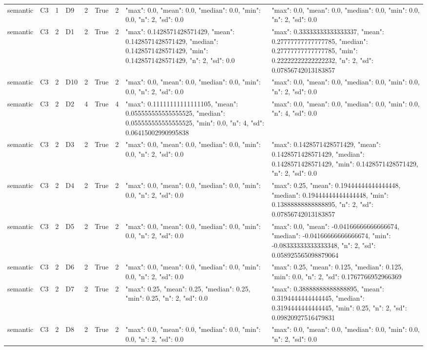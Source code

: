 \begin{tabular}{lllllllll}
semantic & C3 & 1 & D9 & 2 & True & 2 & {"max": 0.0, "mean": 0.0, "median": 0.0, "min": 0.0, "n": 2, "sd": 0.0} & {"max": 0.0, "mean": 0.0, "median": 0.0, "min": 0.0, "n": 2, "sd": 0.0} \\
semantic & C3 & 2 & D1 & 2 & True & 2 & {"max": 0.1428571428571429, "mean": 0.1428571428571429, "median": 0.1428571428571429, "min": 0.1428571428571429, "n": 2, "sd": 0.0} & {"max": 0.33333333333333337, "mean": 0.27777777777777785, "median": 0.27777777777777785, "min": 0.22222222222222232, "n": 2, "sd": 0.07856742013183857} \\
semantic & C3 & 2 & D10 & 2 & True & 2 & {"max": 0.0, "mean": 0.0, "median": 0.0, "min": 0.0, "n": 2, "sd": 0.0} & {"max": 0.0, "mean": 0.0, "median": 0.0, "min": 0.0, "n": 2, "sd": 0.0} \\
semantic & C3 & 2 & D2 & 4 & True & 4 & {"max": 0.11111111111111105, "mean": 0.055555555555555525, "median": 0.055555555555555525, "min": 0.0, "n": 4, "sd": 0.06415002990995838} & {"max": 0.0, "mean": 0.0, "median": 0.0, "min": 0.0, "n": 4, "sd": 0.0} \\
semantic & C3 & 2 & D3 & 2 & True & 2 & {"max": 0.0, "mean": 0.0, "median": 0.0, "min": 0.0, "n": 2, "sd": 0.0} & {"max": 0.1428571428571429, "mean": 0.1428571428571429, "median": 0.1428571428571429, "min": 0.1428571428571429, "n": 2, "sd": 0.0} \\
semantic & C3 & 2 & D4 & 2 & True & 2 & {"max": 0.0, "mean": 0.0, "median": 0.0, "min": 0.0, "n": 2, "sd": 0.0} & {"max": 0.25, "mean": 0.19444444444444448, "median": 0.19444444444444448, "min": 0.13888888888888895, "n": 2, "sd": 0.07856742013183857} \\
semantic & C3 & 2 & D5 & 2 & True & 2 & {"max": 0.0, "mean": 0.0, "median": 0.0, "min": 0.0, "n": 2, "sd": 0.0} & {"max": 0.0, "mean": -0.04166666666666674, "median": -0.04166666666666674, "min": -0.08333333333333348, "n": 2, "sd": 0.058925565098879064} \\
semantic & C3 & 2 & D6 & 2 & True & 2 & {"max": 0.0, "mean": 0.0, "median": 0.0, "min": 0.0, "n": 2, "sd": 0.0} & {"max": 0.25, "mean": 0.125, "median": 0.125, "min": 0.0, "n": 2, "sd": 0.1767766952966369} \\
semantic & C3 & 2 & D7 & 2 & True & 2 & {"max": 0.25, "mean": 0.25, "median": 0.25, "min": 0.25, "n": 2, "sd": 0.0} & {"max": 0.38888888888888895, "mean": 0.3194444444444445, "median": 0.3194444444444445, "min": 0.25, "n": 2, "sd": 0.09820927516479831} \\
semantic & C3 & 2 & D8 & 2 & True & 2 & {"max": 0.0, "mean": 0.0, "median": 0.0, "min": 0.0, "n": 2, "sd": 0.0} & {"max": 0.0, "mean": 0.0, "median": 0.0, "min": 0.0, "n": 2, "sd": 0.0} \\

\end{tabular}
